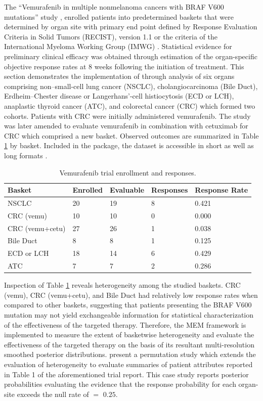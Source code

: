The ``Vemurafenib in multiple nonmelanoma cancers with BRAF V600 mutations'' study \citep{hyman2015}, enrolled patients into predetermined baskets that were determined by organ site with primary end point defined by Response Evaluation Criteria in Solid Tumors (RECIST), version 1.1 \citep{eisenhauer2009} or the criteria of the International Myeloma Working Group (IMWG) \citep{durie2006}. Statistical evidence for preliminary clinical efficacy was obtained through estimation of the organ-specific objective response rates at 8 weeks following the initiation of treatment. This section demonstrates the implementation of  through analysis of six organs comprising non–small-cell lung cancer (NSCLC), cholangiocarcinoma (Bile Duct), Erdheim–Chester disease or Langerhans’-cell histiocytosis (ECD or LCH), anaplastic thyroid cancer (ATC), and colorectal cancer (CRC) which formed two cohorts. Patients with CRC were initially administered vemurafenib. The study was later amended to evaluate vemurafenib in combination with cetuximab for CRC which comprised a new basket. Observed outcomes are summarized in Table \ref{tab_vemu} by basket. Included in the  package, the dataset is accessible in short  as well as long formats .

\begin{table}
	\centering
	\begin{tabular}{|l|l|l|l|l|} \hline
		{\bf Basket} & {\bf Enrolled} & {\bf Evaluable} & {\bf Responses} & {\bf Response Rate}\\ \hline 
		NSCLC          & 20 & 19 & 8  & 0.421 \\ \hline 
		CRC (vemu)     & 10 & 10 & 0  & 0.000   \\ \hline 
		CRC (vemu+cetu) & 27 & 26 & 1  & 0.038 \\ \hline 
		Bile Duct      & 8  &  8 & 1  & 0.125 \\ \hline 
		ECD or LCH     & 18 & 14 & 6  & 0.429 \\ \hline 
		ATC            & 7  &  7 & 2  & 0.286 \\ \hline 
	\end{tabular}
	\caption{Vemurafenib trial enrollment and responses.}
	\label{tab_vemu}
\end{table}

Inspection of Table \ref{tab_vemu} reveals heterogeneity among the studied baskets. CRC (vemu), CRC (vemu+cetu), and Bile Duct had relatively low response rates when compared to other baskets, suggesting that patients presenting the BRAF V600 mutation may not yield exchangeable information for statistical characterization of the effectiveness of the targeted therapy. Therefore, the MEM framework is implemented to measure the extent of basketwise heterogeneity and evaluate the effectiveness of the targeted therapy on the basis of its resultant multi-resolution smoothed posterior distributions. \cite{hobbs2018vemu} present a permutation study which extends the evaluation of heterogeneity to evaluate summaries of patient attributes reported in Table 1 of the aforementioned trial report. This case study reports posterior probabilities evaluating the evidence that the response probability for each organ-site exceeds the null rate of  $=$ $0.25.$


